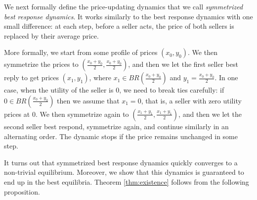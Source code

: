 We next formally define the price-updating dynamics that we call {\em symmetrized best response dynamics}.
It works similarly to the best response dynamics with one small difference: at each step, before a seller acts, the price of both sellers is replaced by their average price.

More formally, we start from some profile of prices $(x_0,y_0)$. We then
symmetrize the prices to $(\frac{x_0+y_0}{2},\frac{x_0+y_0}{2})$, and then we let the first seller best reply to get prices $(x_1,y_1)$,
where $x_1 \in BR(\frac{x_0+y_0}{2})$ and $y_1=\frac{x_0+y_0}{2}$.
In one case, when the utility of the seller is 0, we need to break ties carefully: if  $0\in BR(\frac{x_0+y_0}{2})$ then we assume that $x_1=0$, that is, a seller with zero utility prices at 0.
We then symmetrize again to $(\frac{x_1+y_1}{2},\frac{x_1+y_1}{2})$, and then we let the second seller best respond, symmetrize again, and continue similarly in an alternating order.
The dynamic stops if the price remains unchanged in some step.


It turns out that symmetrized best response dynamics quickly converges to a non-trivial equilibrium. Moreover, we show that this dynamics is guaranteed to end up in the best equilibria. Theorem \ref{thm:existence} follows from the following proposition.

